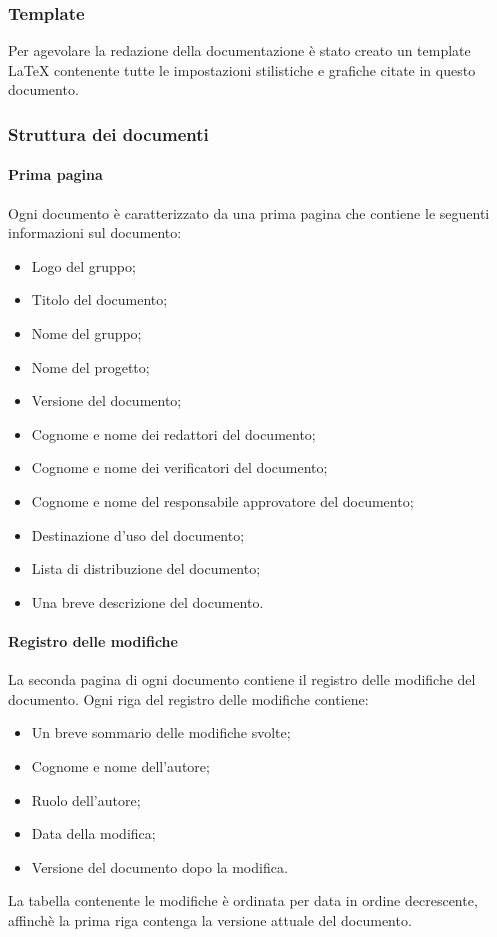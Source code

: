 	\subsubsection{Template}
	Per agevolare la redazione della documentazione è stato creato un template \LaTeX\text{ } contenente tutte le impostazioni stilistiche e grafiche citate in questo documento.
	
	\subsubsection{Struttura dei documenti}
	
		\paragraph{Prima pagina}\Spazio
		Ogni documento è caratterizzato da una prima pagina che contiene le seguenti informazioni sul documento:
		\begin{itemize}
			\item Logo del gruppo;
			\item Titolo del documento;
			\item Nome del gruppo;
			\item Nome del progetto;
			\item Versione del documento;
			\item Cognome e nome dei redattori del documento;
			\item Cognome e nome dei verificatori del documento;
			\item Cognome e nome del responsabile approvatore del documento;
			\item Destinazione d’uso del documento;
			\item Lista di distribuzione del documento;
			\item Una breve descrizione del documento.
		\end{itemize}
	
		\paragraph{Registro delle modifiche} \Spazio
		\label{registroModifiche}
		La seconda pagina di ogni documento contiene il registro delle modifiche del documento.
		Ogni riga del registro delle modifiche contiene:
		\begin{itemize}
			\item Un breve sommario delle modifiche svolte;
			\item Cognome e nome dell’autore;
			\item Ruolo dell’autore;
			\item Data della modifica;
			\item Versione del documento dopo la modifica.
		\end{itemize}
		La tabella contenente le modifiche è ordinata per data in ordine decrescente, affinchè la prima riga contenga la versione attuale del documento.
		
